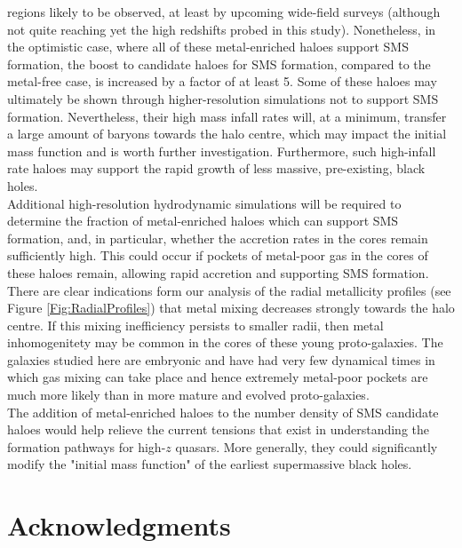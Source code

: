\documentclass[graphics, twocolumn, usenatbib]{mn2e}
\begin{document}
regions likely to be observed, at least by upcoming wide-field surveys (although not quite reaching yet the high
redshifts probed in this study). Nonetheless, 
in the optimistic case, where all of these metal-enriched haloes support SMS formation, the boost to
candidate haloes for SMS formation, compared to the metal-free case, is increased by a factor of at least 5. Some of these haloes may ultimately be shown through higher-resolution simulations not to support SMS formation. Nevertheless, their high mass infall rates will, at a minimum, transfer a large amount of 
baryons towards the halo centre, which may impact the initial mass function and is worth
further investigation. Furthermore, such high-infall rate haloes may support the rapid growth of less massive, pre-existing,
black holes. \\
\indent Additional high-resolution hydrodynamic simulations will be required to
determine the fraction of metal-enriched haloes which can support SMS formation, and, in particular, whether the accretion rates in the cores remain sufficiently high.  This could occur if pockets of metal-poor gas in the cores of these haloes remain, allowing rapid accretion and supporting SMS formation. There are clear
indications form our analysis of the radial metallicity profiles (see Figure \ref{Fig:RadialProfiles}) that
metal mixing decreases strongly towards the halo centre. If this mixing inefficiency persists to smaller radii,
then metal inhomogenitety may be common in the cores of these young proto-galaxies. The galaxies studied here are
embryonic and have had very few dynamical times in which 
gas mixing can take place and hence extremely metal-poor pockets are much more likely than in more mature and evolved proto-galaxies.\\
\indent  The addition of metal-enriched haloes to the number density of SMS
candidate haloes would help relieve the current tensions that exist in understanding the formation pathways for high-$z$ quasars. More generally, they could significantly modify the "initial mass function" of the earliest supermassive black holes.

\section*{Acknowledgments}
\end{document}
